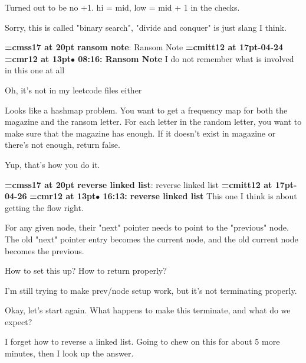 Turned out to be no +1. hi = mid, low = mid + 1 in the checks.
\par

Sorry, this is called "binary search", "divide and conquer" is just slang I think.
\par

{\medskip\noindent\bf\font\titlefont=cmss17 at 20pt ransom note}: Ransom Note
{\medskip\noindent\bf\font\titlefont=cmitt12 at 17pt-04-24}\medskip
{\smallskip\noindent\bf\font\titlefont=cmr12 at 13pt\titlefont $\bullet$ 08:16: Ransom Note}\smallskip
I do not remember what is involved in this one at all
\par

Oh, it's not in my leetcode files either
\par

Looks like a hashmap problem. You want to get a frequency map for both the magazine and the ransom letter. For each letter in the random letter, you want to make sure that the magazine has enough. If it doesn't exist in magazine or there's not enough, return false.
\par

Yup, that's how you do it.
\par

{\medskip\noindent\bf\font\titlefont=cmss17 at 20pt reverse linked list}: reverse linked list
{\medskip\noindent\bf\font\titlefont=cmitt12 at 17pt-04-26}\medskip
{\smallskip\noindent\bf\font\titlefont=cmr12 at 13pt\titlefont $\bullet$ 16:13: reverse linked list}\smallskip
This one I think is about getting the flow right.
\par

For any given node, their "next" pointer needs to point to the "previous" node. The old "next" pointer entry becomes the current node, and the old current node becomes the previous.
\par

How to set this up? How to return properly?
\par

I'm still trying to make prev/node setup work, but it's not terminating properly.
\par

Okay, let's start again. What happens to make this terminate, and what do we expect?
\par

I forget how to reverse a linked list. Going to chew on this for about 5 more minutes, then I look up the answer.
\par

